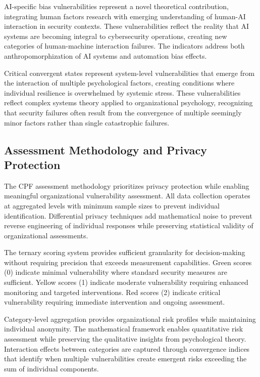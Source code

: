 \documentclass[11pt,a4paper]{article}
\begin{document}
AI-specific bias vulnerabilities represent a novel theoretical contribution, integrating human factors research with emerging understanding of human-AI interaction in security contexts. These vulnerabilities reflect the reality that AI systems are becoming integral to cybersecurity operations, creating new categories of human-machine interaction failures. The indicators address both anthropomorphization of AI systems and automation bias effects.

Critical convergent states represent system-level vulnerabilities that emerge from the interaction of multiple psychological factors, creating conditions where individual resilience is overwhelmed by systemic stress. These vulnerabilities reflect complex systems theory applied to organizational psychology, recognizing that security failures often result from the convergence of multiple seemingly minor factors rather than single catastrophic failures.

\subsection{Assessment Methodology and Privacy Protection}

The CPF assessment methodology prioritizes privacy protection while enabling meaningful organizational vulnerability assessment. All data collection operates at aggregated levels with minimum sample sizes to prevent individual identification. Differential privacy techniques add mathematical noise to prevent reverse engineering of individual responses while preserving statistical validity of organizational assessments.

The ternary scoring system provides sufficient granularity for decision-making without requiring precision that exceeds measurement capabilities. Green scores (0) indicate minimal vulnerability where standard security measures are sufficient. Yellow scores (1) indicate moderate vulnerability requiring enhanced monitoring and targeted interventions. Red scores (2) indicate critical vulnerability requiring immediate intervention and ongoing assessment.

Category-level aggregation provides organizational risk profiles while maintaining individual anonymity. The mathematical framework enables quantitative risk assessment while preserving the qualitative insights from psychological theory. Interaction effects between categories are captured through convergence indices that identify when multiple vulnerabilities create emergent risks exceeding the sum of individual components.
\end{document}
